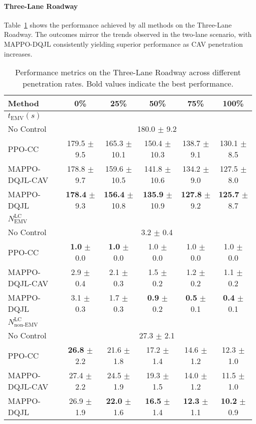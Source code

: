 \paragraph{Three-Lane Roadway} 
Table~\ref{tab:penetration_rate_three_lane} shows the performance achieved by all methods on the Three-Lane Roadway. The outcomes mirror the trends observed in the two-lane scenario, with MAPPO-DQJL consistently yielding superior performance as CAV penetration increases.
\begin{table}[htbp]
\centering
{\fontsize{9}{11}\selectfont
\begin{tabular}{lccccc}
\toprule
\textbf{Method} & \textbf{0\%} & \textbf{25\%} & \textbf{50\%} & \textbf{75\%} & \textbf{100\%} \\
\midrule
\textbf{\textit{$t_{\text{EMV}} (s)$}} & & & & & \\ 
\multirow{1}{*}{No Control} & \multicolumn{5}{c}{180.0 $\pm$ 9.2} \\[6pt]
PPO-CC~\cite{suo2024model} 
& 179.5 $\pm$ 9.5 & 165.3 $\pm$ 10.1 & 150.4 $\pm$ 10.3 & 138.7 $\pm$ 9.1 & 130.1 $\pm$ 8.5 \\[6pt]
MAPPO-DQJL-CAV 
& 178.8 $\pm$ 9.7 & 159.6 $\pm$ 10.5 & 141.8 $\pm$ 10.6 & 134.2 $\pm$ 9.0 & 127.5 $\pm$ 8.0 \\[6pt]
MAPPO-DQJL 
& \textbf{178.4} $\pm$ 9.3 & \textbf{156.4} $\pm$ 10.8 & \textbf{135.9} $\pm$ 10.9 & \textbf{127.8} $\pm$ 9.2 & \textbf{125.7} $\pm$ 8.7 \\
\midrule
\textbf{\textit{\boldmath$N_{\text{EMV}}^{\text{LC}}$}} & & & & & \\ 
\multirow{1}{*}{No Control} & \multicolumn{5}{c}{3.2 $\pm$ 0.4} \\[6pt]
PPO-CC~\cite{suo2024model} 
& \textbf{1.0} $\pm$ 0.0 & \textbf{1.0} $\pm$ 0.0 & 1.0 $\pm$ 0.0 & 1.0 $\pm$ 0.0 & 1.0 $\pm$ 0.0 \\[6pt]
MAPPO-DQJL-CAV 
& 2.9 $\pm$ 0.4 & 2.1 $\pm$ 0.3 & 1.5 $\pm$ 0.2 & 1.2 $\pm$ 0.2 & 1.1 $\pm$ 0.2 \\[6pt]
MAPPO-DQJL 
& 3.1 $\pm$ 0.3 & 1.7 $\pm$ 0.3 & \textbf{0.9} $\pm$ 0.2 & \textbf{0.5} $\pm$ 0.1 & \textbf{0.4} $\pm$ 0.1 \\
\midrule
\textbf{\textit{\boldmath$N_{\text{non-EMV}}^{\text{LC}}$}} & & & & & \\ 
\multirow{1}{*}{No Control} & \multicolumn{5}{c}{27.3 $\pm$ 2.1} \\[6pt]
PPO-CC~\cite{suo2024model} 
& \textbf{26.8} $\pm$ 2.2 & 21.6 $\pm$ 1.8 & 17.2 $\pm$ 1.4 & 14.6 $\pm$ 1.2 & 12.3 $\pm$ 1.0 \\[6pt]
MAPPO-DQJL-CAV 
& 27.4 $\pm$ 2.2 & 24.5 $\pm$ 1.9 & 19.3 $\pm$ 1.5 & 14.0 $\pm$ 1.2 & 11.5 $\pm$ 1.0 \\[6pt]
MAPPO-DQJL 
& 26.9 $\pm$ 1.9 & \textbf{22.0} $\pm$ 1.6 & \textbf{16.5} $\pm$ 1.4 & \textbf{12.3} $\pm$ 1.1 & \textbf{10.2} $\pm$ 0.9 \\
\bottomrule
\end{tabular}
}
\caption{Performance metrics on the Three-Lane Roadway across different penetration rates. Bold values indicate the best performance.}
\label{tab:penetration_rate_three_lane}
\end{table}
